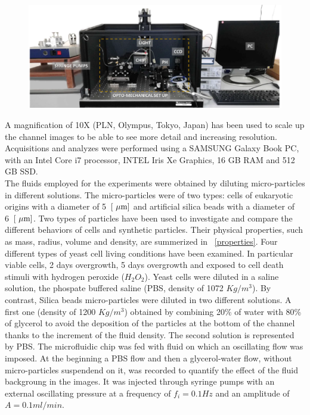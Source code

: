 \documentclass[journal]{IEEEtran}
\theoremstyle{definition}
\theoremstyle{remark}
\begin{document}
\begin{figure}[t]
	\centering
	\includegraphics[width=1\columnwidth]{images/setup}
\end{figure}

A magnification of 10X (PLN, Olympus, Tokyo, Japan) has been used to scale up the channel images to be able to see more detail and increasing resolution.
Acquisitions and analyzes were performed using a SAMSUNG Galaxy Book PC, with an Intel Core i7 processor, INTEL Iris Xe Graphics, 16 GB RAM and 512 GB SSD.
\\The fluids employed for the experiments were obtained by diluting micro-particles in different solutions. The micro-particles were of two types: cells of eukaryotic origins with a diameter of 5~$[\rm~\mu m]$ and artificial silica beads with a diameter of 6~$[\rm~\mu m]$. Two types of particles have been used to investigate and compare the different behaviors of cells and synthetic particles. Their physical properties, such as mass, radius, volume and density, are summerized in ~\tab\ref{properties}. Four different types of yeast cell living conditions have been examined. In particular viable cells, 2 days overgrowth, 5 days overgrowth and exposed to cell death stimuli with hydrogen peroxide ($H_2O_2$). 
Yeast cells were diluted in a saline solution, the phospate buffered saline (PBS, density of 1072 $Kg/m^3$). By contrast, Silica beads micro-particles were diluted in two different solutions. A first one (density of 1200 $Kg/m^3$) obtained by combining 20\% of water with 80\% of glycerol to avoid the deposition of the particles at the bottom of the channel thanks to the increment of the fluid density. The second solution is represented by PBS.
The microfluidic chip was fed with fluid on which an oscillating flow was imposed.
At the beginning a PBS flow and then a glycerol-water flow, without micro-particles suspendend on it, was recorded to quantify the effect of the fluid backgroung in the images. It was injected through syringe pumps with an external oscillating pressure at a frequency of $f_i= 0.1 Hz$ and an amplitude of $A=0.1 ml/min$. 
\end{document}
